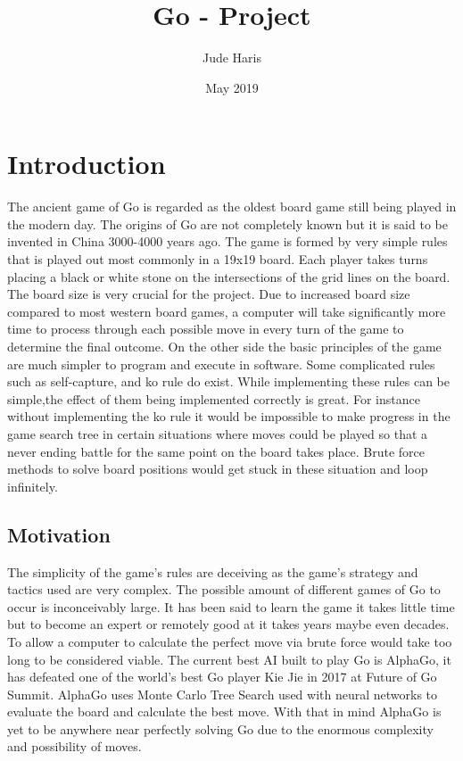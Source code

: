\documentclass{l4proj}
\title{Go - Project}
\author{Jude Haris}
\date{May 2019}
\begin{document}
\maketitle
\chapter{Introduction}


The ancient game of Go is regarded as the oldest board game still being played in the modern day. The origins of Go are not completely known but it is said to be invented in China 3000-4000 years ago. The game is formed by very simple rules that is played out most commonly in a 19x19 board. Each player takes turns placing a black or white stone on the intersections of the grid lines on the board. The board size is very crucial for the project. Due to increased board size compared to most western board games, a computer will take significantly more time to process through each possible move in every turn of the game to determine the final outcome. On the other side the basic principles of the game are much simpler to program and execute in software. Some complicated rules such as self-capture, and ko rule do exist. While implementing these rules can be simple,the effect of them being implemented correctly is great. For instance without implementing the ko rule it would be impossible to make progress in the game search tree in certain situations where moves could be played so that a never ending battle for the same point on the board takes place. Brute force methods to solve board positions would get stuck in these situation and loop infinitely.


\section{Motivation}
The simplicity of the game's rules are deceiving as the game's strategy and tactics used are very complex. The possible amount of different games of Go to occur is inconceivably large. It has been said to learn the game it takes little time but to become an expert or remotely good at it takes years maybe even decades. To allow a computer to calculate the perfect move via brute force would take too long to be considered viable. The current best AI built to play Go is AlphaGo, it has defeated one of the world's best Go player Kie Jie in 2017 at Future of Go Summit. AlphaGo uses Monte Carlo Tree Search used with neural networks to evaluate the board and calculate the best move. With that in mind AlphaGo is yet to be anywhere near perfectly solving Go due to the enormous complexity and possibility of moves.
\end{document}
